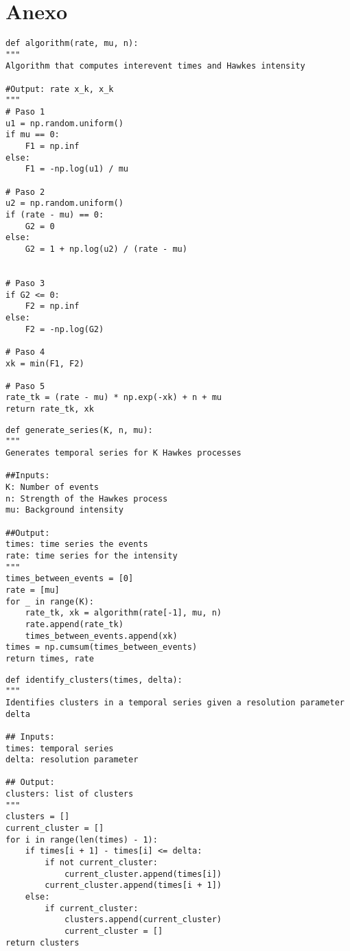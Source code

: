 \chapter*{Anexo}
\begin{lstlisting}[caption = {Algoritmo.}, label = {lst:}]
def algorithm(rate, mu, n):
"""
Algorithm that computes interevent times and Hawkes intensity

#Output: rate x_k, x_k
"""                                    
# Paso 1
u1 = np.random.uniform()
if mu == 0:
    F1 = np.inf
else:
    F1 = -np.log(u1) / mu

# Paso 2
u2 = np.random.uniform()
if (rate - mu) == 0:
    G2 = 0
else:
    G2 = 1 + np.log(u2) / (rate - mu)
    

# Paso 3
if G2 <= 0:
    F2 = np.inf
else:
    F2 = -np.log(G2)

# Paso 4
xk = min(F1, F2)

# Paso 5
rate_tk = (rate - mu) * np.exp(-xk) + n + mu
return rate_tk, xk 
\end{lstlisting}

\begin{lstlisting}[caption = {Generar series.}, label = {lst:}]
def generate_series(K, n, mu):
"""
Generates temporal series for K Hawkes processes

##Inputs:
K: Number of events
n: Strength of the Hawkes process
mu: Background intensity 

##Output:
times: time series the events
rate: time series for the intensity
"""
times_between_events = [0]
rate = [mu]
for _ in range(K):
    rate_tk, xk = algorithm(rate[-1], mu, n)
    rate.append(rate_tk)
    times_between_events.append(xk)
times = np.cumsum(times_between_events)
return times, rate
\end{lstlisting}

\begin{lstlisting}[caption = {Identify clusters.}, label = {lst:}]
def identify_clusters(times, delta):
"""
Identifies clusters in a temporal series given a resolution parameter delta

## Inputs:
times: temporal series
delta: resolution parameter

## Output:
clusters: list of clusters
"""
clusters = []
current_cluster = []
for i in range(len(times) - 1):
    if times[i + 1] - times[i] <= delta:
        if not current_cluster:
            current_cluster.append(times[i])
        current_cluster.append(times[i + 1])
    else:
        if current_cluster:
            clusters.append(current_cluster)
            current_cluster = []
return clusters
\end{lstlisting}

